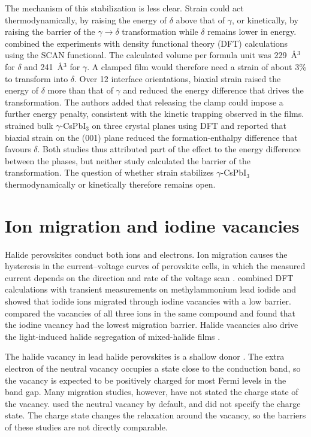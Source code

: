The mechanism of this stabilization is less clear. Strain could act thermodynamically, by raising the energy of $\delta$ above that of $\gamma$, or kinetically, by raising the barrier of the $\gamma\rightarrow\delta$ transformation while $\delta$ remains lower in energy. \citet{Steele2019} combined the experiments with density functional theory (DFT) calculations using the SCAN functional. The calculated volume per formula unit was 229~\AA$^3$ for $\delta$ and 241~\AA$^3$ for $\gamma$. A clamped film would therefore need a strain of about 3\% to transform into $\delta$. Over 12 interface orientations, biaxial strain raised the energy of $\delta$ more than that of $\gamma$ and reduced the energy difference that drives the transformation. The authors added that releasing the clamp could impose a further energy penalty, consistent with the kinetic trapping observed in the films. \citet{Zhang2025} strained bulk $\gamma$-CsPbI$_3$ on three crystal planes using DFT and reported that biaxial strain on the (001) plane reduced the formation-enthalpy difference that favours $\delta$. Both studies thus attributed part of the effect to the energy difference between the phases, but neither study calculated the barrier of the transformation. The question of whether strain stabilizes $\gamma$-CsPbI$_3$ thermodynamically or kinetically therefore remains open.

\section{Ion migration and iodine vacancies}
\label{sec:migration}

Halide perovskites conduct both ions and electrons. Ion migration causes the hysteresis in the current--voltage curves of perovskite cells, in which the measured current depends on the direction and rate of the voltage scan \citep{Snaith2014}. \citet{Eames2015} combined DFT calculations with transient measurements on methylammonium lead iodide and showed that iodide ions migrated through iodine vacancies with a low barrier. \citet{Azpiroz2015} compared the vacancies of all three ions in the same compound and found that the iodine vacancy had the lowest migration barrier. Halide vacancies also drive the light-induced halide segregation of mixed-halide films \citep{Hoke2015}.

The halide vacancy in lead halide perovskites is a shallow donor \citep{Kang2017}. The extra electron of the neutral vacancy occupies a state close to the conduction band, so the vacancy is expected to be positively charged for most Fermi levels in the band gap. Many migration studies, however, have not stated the charge state of the vacancy. \citet{Zhang2025} used the neutral vacancy by default, and \citet{Arber2025} did not specify the charge state. The charge state changes the relaxation around the vacancy, so the barriers of these studies are not directly comparable.

